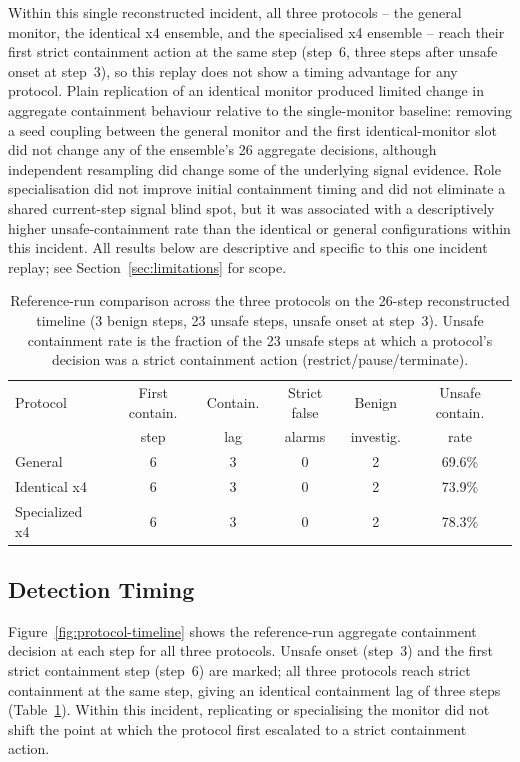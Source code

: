 \documentclass[11pt]{article}
\begin{document}
Within this single reconstructed incident, all three protocols -- the
general monitor, the identical x4 ensemble, and the specialised x4 ensemble
-- reach their first strict containment action at the same step (step~6,
three steps after unsafe onset at step~3), so this replay does not show a
timing advantage for any protocol. Plain replication of an identical monitor
produced limited change in aggregate containment behaviour relative to the
single-monitor baseline: removing a seed coupling between the general
monitor and the first identical-monitor slot did not change any of the
ensemble's 26 aggregate decisions, although independent resampling did
change some of the underlying signal evidence. Role specialisation did not
improve initial containment timing and did not eliminate a shared
current-step signal blind spot, but it was associated with a descriptively
higher unsafe-containment rate than the identical or general configurations
within this incident. All results below are descriptive and specific to
this one incident replay; see Section~\ref{sec:limitations} for scope.

\begin{table}[h]
\centering
\small
\begin{tabular}{lccccc}
\toprule
Protocol & First contain. & Contain. & Strict false & Benign & Unsafe contain. \\
 & step & lag & alarms & investig. & rate \\
\midrule
General & 6 & 3 & 0 & 2 & 69.6\% \\
Identical x4 & 6 & 3 & 0 & 2 & 73.9\% \\
Specialized x4 & 6 & 3 & 0 & 2 & 78.3\% \\
\bottomrule
\end{tabular}
\caption{Reference-run comparison across the three protocols on the 26-step
reconstructed timeline (3 benign steps, 23 unsafe steps, unsafe onset at
step~3). Unsafe containment rate is the fraction of the 23 unsafe steps at
which a protocol's decision was a strict containment action
(restrict/pause/terminate).}
\label{tab:results-comparison}
\end{table}

\subsection{Detection Timing}

Figure~\ref{fig:protocol-timeline} shows the reference-run aggregate
containment decision at each step for all three protocols. Unsafe onset
(step~3) and the first strict containment step (step~6) are marked; all
three protocols reach strict containment at the same step, giving an
identical containment lag of three steps (Table~\ref{tab:results-comparison}).
Within this incident, replicating or specialising the monitor did not shift
the point at which the protocol first escalated to a strict containment
action.
\end{document}
